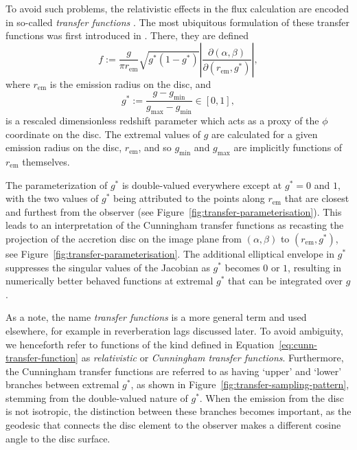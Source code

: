 \documentclass[fleqn,usenatbib]{mnras}
\newcommand{\rhoem}{r_\text{em}}
\newcommand{\jacobian}[2]{\left\lvert \frac{\partial #1}{\partial #2} \right\rvert}
\begin{document}
To avoid such problems, the relativistic effects in the flux calculation are
encoded in so-called \emph{transfer functions}
\citep[e.g.][]{brenneman_constraining_2006}. The most ubiquitous formulation of
these transfer functions was first introduced in \citet{cunningham_effects_1975}.
There, they are defined
\begin{equation}
    \label{eq:cunn-transfer-function}
    f:=\frac{g}{\pi \rhoem} \sqrt{g^\ast(1 - g^\ast)} \jacobian{(\alpha, \beta)}{(\rhoem, g^\ast)},
\end{equation}
where $\rhoem$ is the emission radius on the disc, and
\begin{equation}
    g^\ast := \frac{g - g_\text{min}}{g_\text{max} - g_\text{min}} \in [0, 1],
\end{equation}
is a rescaled dimensionless redshift parameter which acts as a proxy of the
$\phi$ coordinate on the disc. The extremal values of $g$ are
calculated for a given emission radius on the disc, $\rhoem$, and so
$g_\text{min}$ and $g_\text{max}$ are implicitly functions of $\rhoem$
themselves.

The parameterization of $g^\ast$ is double-valued everywhere except at $g^\ast =
0$ and $1$, with the two values of $g^\ast$ being attributed to the points along
$\rhoem$ that are closest and furthest from the observer (see
Figure~\ref{fig:transfer-parameterisation}). This leads to an interpretation of the
Cunningham transfer functions as recasting the projection of the accretion disc
on the image plane from $(\alpha, \beta)$ to $(\rhoem, g^\ast)$, see
Figure~\ref{fig:transfer-parameterisation}. The additional elliptical envelope in
$g^\ast$ suppresses the singular values of the Jacobian as $g^\ast$ becomes $0$
or $1$, resulting in numerically better behaved functions at extremal $g^\ast$
that can be integrated over $g$.

As a note, the name \emph{transfer functions} is a more general term and used
elsewhere, for example in reverberation lags discussed later. To avoid
ambiguity, we henceforth refer to functions of the kind defined in
Equation~\eqref{eq:cunn-transfer-function} as \emph{relativistic} or
\emph{Cunningham transfer functions}. Furthermore, the Cunningham transfer
functions are referred to as having `upper' and `lower' branches between
extremal $g^\ast$, as shown in Figure~\ref{fig:transfer-sampling-pattern},
stemming from the double-valued nature of $g^\ast$. When the emission from the
disc is not isotropic, the distinction between these branches becomes important,
as the geodesic that connects the disc element to the observer makes a different
cosine angle to the disc surface.
\end{document}
